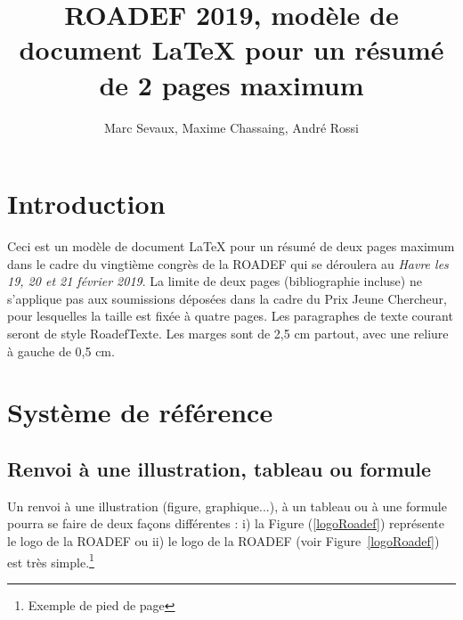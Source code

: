 \documentclass{roadef}
\begin{document}
\title{ROADEF 2019, modèle de document \LaTeX{} pour un résumé de \textbf{2} pages maximum}

\def\shorttitle{Titre court}

\author{Marc Sevaux, Maxime Chassaing, André Rossi }


{}


\maketitle
\thispagestyle{empty}



\section{Introduction}

Ceci est un modèle de document  \LaTeX{} pour un résumé de deux pages maximum dans le cadre du vingtième congrès de la ROADEF qui se déroulera au \textit{Havre les 19, 20 et 21 février 2019}. La limite de deux pages (bibliographie incluse) ne s'applique pas aux soumissions déposées dans la cadre du Prix Jeune Chercheur, pour lesquelles la taille est fixée à quatre pages. Les paragraphes de texte courant seront de style RoadefTexte. Les marges sont de 2,5 cm partout, avec une reliure à gauche de 0,5 cm.


\section{Système de référence}

\subsection{Renvoi à une illustration, tableau ou formule}

Un renvoi à une illustration (figure, graphique...), à un tableau ou à une formule pourra se faire de deux façons différentes : i) la Figure (\ref{logoRoadef}) représente le logo de la ROADEF ou ii) le logo de la ROADEF (voir Figure~\ref{logoRoadef}) est très simple.\footnote{Exemple de pied de page}
\end{document}
